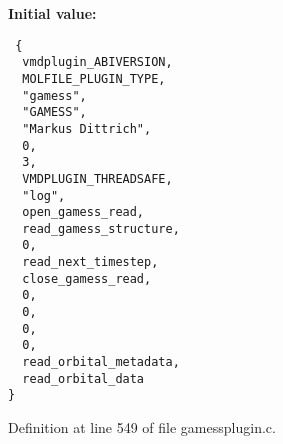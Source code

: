 {\bf Initial value:}

\footnotesize\begin{verbatim} {
  vmdplugin_ABIVERSION,
  MOLFILE_PLUGIN_TYPE,                         
  "gamess",                                    
  "GAMESS",                                    
  "Markus Dittrich",                           
  0,                                           
  3,                                           
  VMDPLUGIN_THREADSAFE,                        
  "log",
  open_gamess_read,
  read_gamess_structure,
  0,
  read_next_timestep,
  close_gamess_read,
  0,
  0,
  0,
  0,
  read_orbital_metadata,
  read_orbital_data
}\end{verbatim}\normalsize 


Definition at line 549 of file gamessplugin.c.